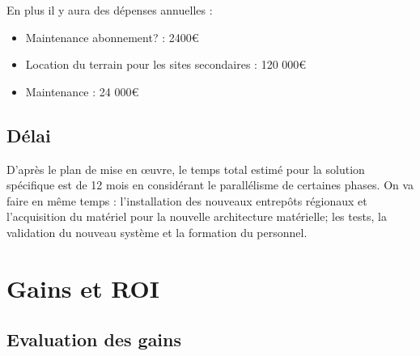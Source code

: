     En plus il y aura des dépenses annuelles :
    \begin{itemize}
          \item Maintenance abonnement? : 2400€
          \item Location du terrain pour les sites secondaires : 120 000€
          \item Maintenance : 24 000€
    \end{itemize}

        \subsection{Délai}

              D'après le plan de mise en œuvre, le temps total estimé pour la solution spécifique est de 12 mois en considérant le parallélisme de certaines phases. On va faire en même temps : l'installation des nouveaux entrepôts régionaux et l'acquisition du matériel pour la nouvelle architecture matérielle; les tests, la validation du nouveau système et la formation du personnel.


\section{Gains et ROI}
\subsection{Evaluation des gains}

